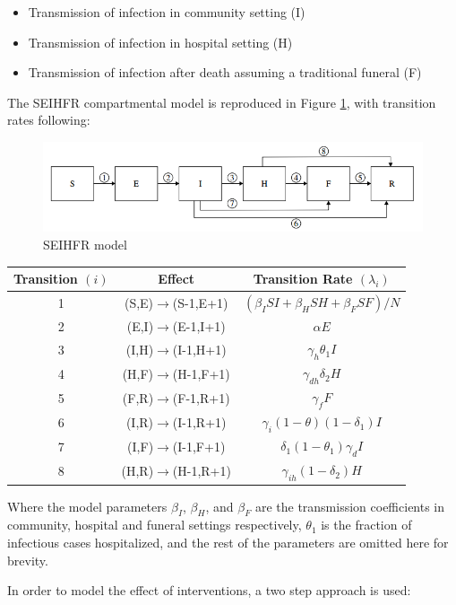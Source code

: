 \documentclass[10pt, journal,onecolumn]{IEEEtran}
\begin{document}
\begin{itemize}
\item Transmission of infection in community setting (I)
\item Transmission of infection in hospital setting (H)
\item Transmission of infection after death assuming a traditional funeral (F)
\end{itemize}


The SEIHFR compartmental model is reproduced in Figure \ref{fig:SEIHFR_model}, with transition rates
following:

\begin{figure}[h!]
\centering
\includegraphics[scale=0.5]{seihfr_model_fig}
\caption{SEIHFR model}
\label{fig:SEIHFR_model}
\end{figure}

\begin{center}
\begin{tabular}{|c|c|c|}
\hline 
Transition $(i)$ & Effect & Transition Rate $(\lambda_i)$ \tabularnewline
\hline 
\hline 
1 & (S,E)$\to$(S-1,E+1) & $(\beta_{I}SI+\beta_{H}SH+\beta_{F}SF)/N$\tabularnewline
\hline 
2 & (E,I)$\to$(E-1,I+1) & $\alpha E$\tabularnewline
\hline 
3 & (I,H)$\to$(I-1,H+1) & $\gamma_{h}\theta_{1}I$\tabularnewline
\hline 
4 & (H,F)$\to$(H-1,F+1) & $\gamma_{dh}\delta_{2}H$\tabularnewline
\hline 
5 & (F,R)$\to$(F-1,R+1) & $\gamma_{f}F$\tabularnewline
\hline 
6 & (I,R)$\to$(I-1,R+1) & $\gamma_{i}(1-\theta)(1-\delta_{1})I$\tabularnewline
\hline 
7 & (I,F)$\to$(I-1,F+1) & $\delta_{1}(1-\theta_{1})\gamma_{d}I$\tabularnewline
\hline 
8 & (H,R)$\to$(H-1,R+1) & $\gamma_{ih}(1-\delta_{2})H$\tabularnewline
\hline 
\end{tabular}
\end{center}

Where the model parameters $\beta_I$, $\beta_H$, and $\beta_F$ are the transmission
coefficients in community, hospital and funeral settings respectively, $\theta_1$ is the fraction of infectious
cases hospitalized, and the rest of the parameters are omitted here for brevity.

In order to model the effect of interventions, a two step approach is used:
\end{document}
